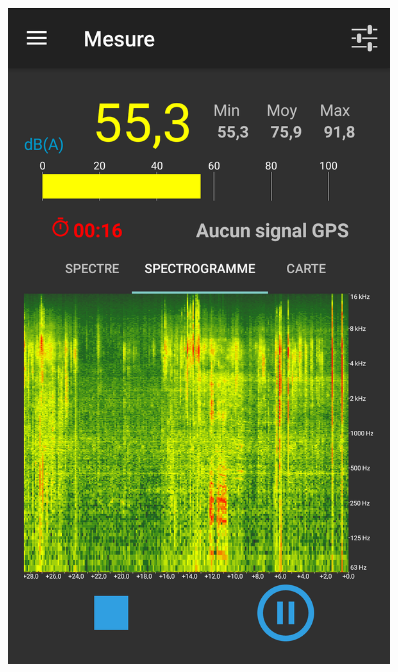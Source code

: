 \begin{figure}[t]
\begin{center}
\begin{minipage}[t]{0.3\textwidth}
        \includegraphics[width=0.9\textwidth]{./figures/autres/noiseCapture3.png}
    \end{minipage}
    \begin{minipage}[t]{0.3\textwidth}
        \centering

\end{minipage}
\end{center}
\end{figure}
